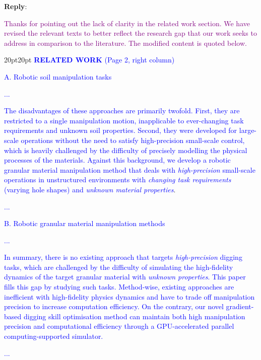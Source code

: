 \documentclass[11pt]{article}
\newcounter{reviewer}
\newcounter{point}[reviewer]
\newenvironment{reply}
   {\medskip \noindent \begin{sf}\textbf{Reply}: \  }
   {\medskip \end{sf}}
\newcommand{\rp}[1]{\textcolor{purple}{#1}}
\newcommand{\xt}[1]{\textcolor{blue}{#1}}
\begin{document}
\begin{reply}

\rp{Thanks for pointing out the lack of clarity in the related work section. We have revised the relevant texts to better reflect the research gap that our work seeks to address in comparison to the literature. The modified content is quoted below.}

\begin{adjustwidth}{20pt}{20pt}
\vspace{0.3cm}\noindent\xt{\textbf{RELATED WORK} (Page 2, right column)}

\noindent\xt{A. Robotic soil manipulation tasks}

\xt{...}

\xt{The disadvantages of these approaches are primarily twofold. First, they are restricted to a single manipulation motion, inapplicable to ever-changing task requirements and unknown soil properties. Second, they were developed for large-scale operations without the need to satisfy high-precision small-scale control, which is heavily challenged by the difficulty of precisely modelling the physical processes of the materials.
Against this background, we develop a robotic granular material manipulation method that deals with \textit{high-precision} small-scale operations in unstructured environments with \textit{changing task requirements} (varying hole shapes) and \textit{unknown material properties}}.

\xt{...}

\noindent\xt{B. Robotic granular material manipulation methods}

\xt{...}

\xt{In summary, there is no existing approach that targets \textit{high-precision} digging tasks, which are challenged by the difficulty of simulating the high-fidelity dynamics of the target granular material with \textit{unknown properties}. This paper fills this gap by studying such tasks. Method-wise, existing approaches are inefficient with high-fidelity physics dynamics and have to trade off manipulation precision to increase computation efficiency. On the contrary, our novel gradient-based digging skill optimisation method can maintain both high manipulation precision and computational efficiency through a GPU-accelerated parallel computing-supported simulator.}

\xt{...}

\end{adjustwidth}

\end{reply}
\end{document}
